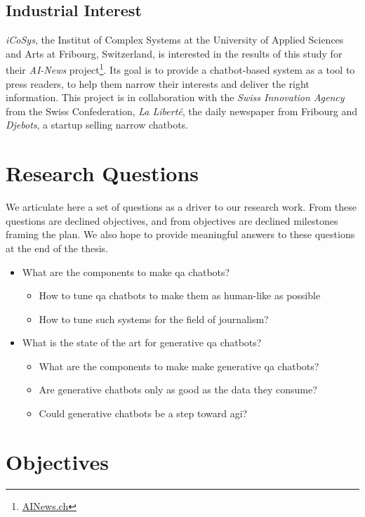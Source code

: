 \subsection*{Industrial Interest}
\textit{iCoSys}, the Institut of Complex Systems at the University of Applied Sciences and Arts at Fribourg, Switzerland, is interested in the results of this study for their \textit{AI-News} project\footnote{\url{AINews.ch}}. Its goal is to provide a chatbot-based system as a tool to press readers, to help them narrow their interests and deliver the right information. This project is in collaboration with the \textit{Swiss Innovation Agency} from the Swiss Confederation, \textit{La Liberté}, the daily newspaper from Fribourg and \textit{Djebots}, a startup selling narrow chatbots.

\section*{Research Questions}
We articulate here a set of questions as a driver to our research work. From these questions are declined objectives, and from objectives are declined milestones framing the plan. We also hope to provide meaningful answers to these questions at the end of the thesis.
\begin{itemize}[noitemsep]
    \item What are the components to make \gls{qa} chatbots?
    \begin{itemize}[noitemsep]
        \item How to tune \gls{qa} chatbots to make them as human-like as possible
        \item How to tune such systems for the field of journalism?
    \end{itemize}
    \item What is the state of the art for generative \gls{qa} chatbots?
    \begin{itemize}[noitemsep]
    	\item What are the components to make make generative \gls{qa} chatbots?
        \item Are generative chatbots only as good as the data they consume?
        \item Could generative chatbots be a step toward \gls{agi}?
    \end{itemize}
\end{itemize}

\section*{Objectives}
